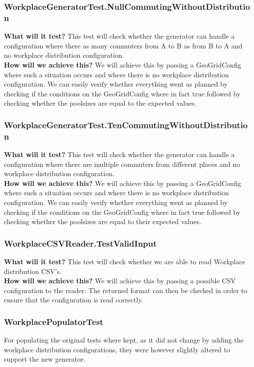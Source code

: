 \documentclass{article}
\begin{document}
\subsubsection{WorkplaceGeneratorTest.NullCommutingWithoutDistribution}
\textbf{What will it test?}
This test will check whether the generator can handle a configuration where there as many commuters from A to B as from B to A and no workplace distribution configuration.\\
\newline
\textbf{How will we achieve this?}
We will achieve this by passing a GeoGridConfig where such a situation occurs and where there is no workplace distribution configuration. We can easily verify whether everything went as planned by checking if the conditions on the GeoGridConfig where in fact true followed by checking whether the poolsizes are equal to the expected values.

\subsubsection{WorkplaceGeneratorTest.TenCommutingWithoutDistribution}
\textbf{What will it test?}
This test will check whether the generator can handle a configuration where there are multiple commuters from different places and no workplace distribution configuration.\\
\newline
\textbf{How will we achieve this?}
We will achieve this by passing a GeoGridConfig where such a situation occurs and where there is no workplace distribution configuration. We can easily verify whether everything went as planned by checking if the conditions on the GeoGridConfig where in fact true followed by checking whether the poolsizes are equal to their expected values.

\subsubsection{WorkplaceCSVReader.TestValidInput}
\textbf{What will it test?}
This test will check whether we are able to read Workplace distribution CSV's.\\
\newline
\textbf{How will we achieve this?}
We will achieve this by passing a possible CSV configuration to the reader. The returned format can then be checked in order to ensure that the configuration is read correctly.

\subsubsection{WorkplacePopulatorTest}
For populating the original tests where kept, as it did not change by adding the workplace distribution configurations, they were however slightly altered to support the new generator.
\end{document}
